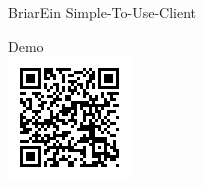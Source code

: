 
\begin{frame}{Briar}{Ein Simple-To-Use-Client}
	\begin{center}
		\Huge Demo \\[20pt]
		\includegraphics[scale=0.7]{res/briar_apk_dl.png}
	\end{center}
\end{frame}